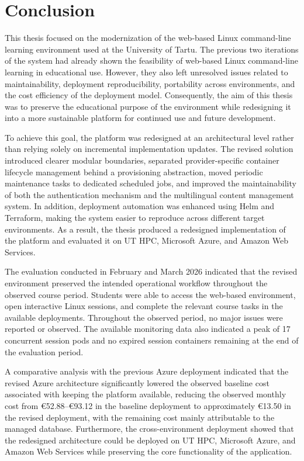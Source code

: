 \section{Conclusion} \label{sec:conclusion}
This thesis focused on the modernization of the web-based Linux command-line learning environment used at the University of Tartu.
The previous two iterations of the system had already shown the feasibility of web-based Linux command-line learning in educational use.
However, they also left unresolved issues related to maintainability, deployment reproducibility, portability across environments, and the cost efficiency of the deployment model.
Consequently, the aim of this thesis was to preserve the educational purpose of the environment while redesigning it into a more sustainable platform for continued use and future development.

To achieve this goal, the platform was redesigned at an architectural level rather than relying solely on incremental implementation updates.
The revised solution introduced clearer modular boundaries, separated provider-specific container lifecycle management behind a provisioning abstraction, moved periodic maintenance tasks to dedicated scheduled jobs, and improved the maintainability of both the authentication mechanism and the multilingual content management system.
In addition, deployment automation was enhanced using Helm and Terraform, making the system easier to reproduce across different target environments.
As a result, the thesis produced a redesigned implementation of the platform and evaluated it on UT HPC, Microsoft Azure, and Amazon Web Services.

The evaluation conducted in February and March 2026 indicated that the revised environment preserved the intended operational workflow throughout the observed course period.
Students were able to access the web-based environment, open interactive Linux sessions, and complete the relevant course tasks in the available deployments.
Throughout the observed period, no major issues were reported or observed.
The available monitoring data also indicated a peak of 17 concurrent session pods and no expired session containers remaining at the end of the evaluation period.

A comparative analysis with the previous Azure deployment indicated that the revised Azure architecture significantly lowered the observed baseline cost associated with keeping the platform available, reducing the observed monthly cost from €52.88--€93.12 in the baseline deployment to approximately €13.50 in the revised deployment, with the remaining cost mainly attributable to the managed database.
Furthermore, the cross-environment deployment showed that the redesigned architecture could be deployed on UT HPC, Microsoft Azure, and Amazon Web Services while preserving the core functionality of the application.


